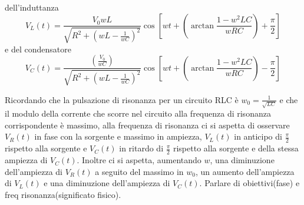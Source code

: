 \documentclass{article}
\begin{document}
dell'induttanza
\begin{equation}
  V_{L}(t)=\frac{V_{0}wL}{\sqrt{R^2+(wL-\frac{1}{wC})^2}}\cos{[wt+(\arctan{\frac{1-w^2LC}{wRC}})+\frac{\pi}{2}]}
\end{equation}
e del condensatore
\begin{equation}
  V_{C}(t)=\frac{(\frac{V_{0}}{wC})}{\sqrt{R^2+(wL-\frac{1}{wC})^2}}\cos{[wt+(\arctan{\frac{1-w^2LC}{wRC}})-\frac{\pi}{2}]}
\end{equation} 

Ricordando che la pulsazione di risonanza per un circuito RLC è $w_0=\frac{1}{\sqrt{LC}}$ e che il modulo della corrente che scorre nel circuito alla frequenza di risonanza corrispondente è massimo, alla frequenza di risonanza ci si aspetta di 
osservare $V_R(t)$ in fase con la sorgente e massimo in ampiezza, $V_L(t)$ in anticipo di $\frac{\pi}{2}$ rispetto alla sorgente e $V_C(t)$ in ritardo di $\frac{\pi}{2}$ rispetto alla sorgente e della stessa ampiezza di  $V_C(t)$. Inoltre ci 
si aspetta, aumentando $w$, una diminuzione dell'ampiezza di $V_R(t)$ a seguito del massimo in $w_0$, un aumento dell'ampiezza di  $V_L(t)$
e una diminuzione dell'ampiezza di $V_C(t)$. Parlare di obiettivi(fase) e freq risonanza(significato fisico).
\end{document}
